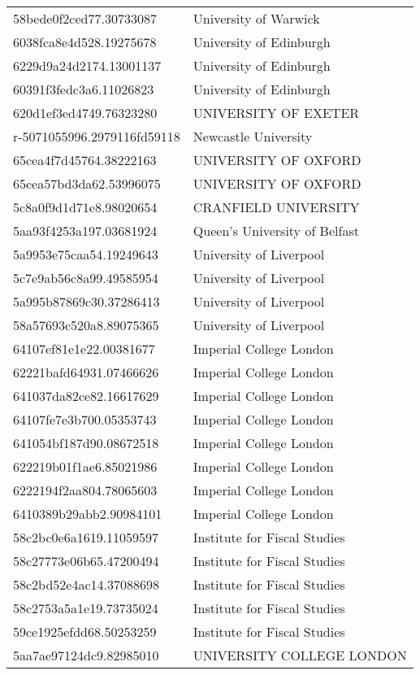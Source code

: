 \begin{tabular}{ll}
58bede0f2ced77.30733087 & University of Warwick \\
6038fca8e4d528.19275678 & University of Edinburgh \\
6229d9a24d2174.13001137 & University of Edinburgh \\
60391f3fedc3a6.11026823 & University of Edinburgh \\
620d1ef3ed4749.76323280 & UNIVERSITY OF EXETER \\
r-5071055996.2979116fd59118 & Newcastle University \\
65cea4f7d45764.38222163 & UNIVERSITY OF OXFORD \\
65cea57bd3da62.53996075 & UNIVERSITY OF OXFORD \\
5c8a0f9d1d71e8.98020654 & CRANFIELD UNIVERSITY \\
5aa93f4253a197.03681924 & Queen's University of Belfast \\
5a9953e75caa54.19249643 & University of Liverpool \\
5c7e9ab56c8a99.49585954 & University of Liverpool \\
5a995b87869c30.37286413 & University of Liverpool \\
58a57693c520a8.89075365 & University of Liverpool \\
64107ef81e1e22.00381677 & Imperial College London \\
62221bafd64931.07466626 & Imperial College London \\
641037da82ce82.16617629 & Imperial College London \\
64107fe7e3b700.05353743 & Imperial College London \\
641054bf187d90.08672518 & Imperial College London \\
622219b01f1ae6.85021986 & Imperial College London \\
6222194f2aa804.78065603 & Imperial College London \\
6410389b29abb2.90984101 & Imperial College London \\
58c2bc0e6a1619.11059597 & Institute for Fiscal Studies \\
58c27773e06b65.47200494 & Institute for Fiscal Studies \\
58c2bd52e4ac14.37088698 & Institute for Fiscal Studies \\
58c2753a5a1e19.73735024 & Institute for Fiscal Studies \\
59ce1925efdd68.50253259 & Institute for Fiscal Studies \\
5aa7ae97124dc9.82985010 & UNIVERSITY COLLEGE LONDON \\

\end{tabular}
